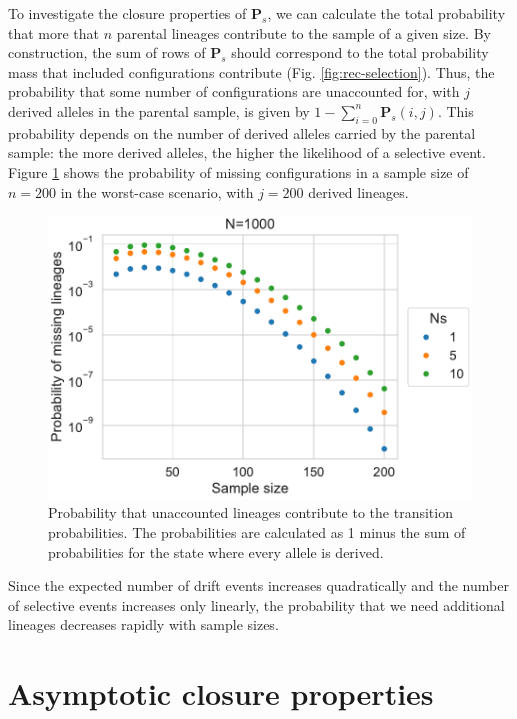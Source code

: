 \documentclass[review]{elsarticle}
\begin{document}
To investigate the closure properties of $\mathbf{P}_s$, we can calculate the total probability that
more that $n$ parental lineages contribute to the sample of a given size. By construction, the sum
of rows of $\mathbf{P}_s$ should correspond to the total probability mass that included
configurations contribute (Fig. \ref{fig:rec-selection}). Thus, the probability that some number of
configurations are unaccounted for, with $j$ derived alleles in the parental sample, is given by
$1-\sum_{i=0}^{n}\mathbf{P}_s(i,j)$. This probability depends on the number of derived alleles
carried by the parental sample: the more derived alleles, the higher the likelihood of a selective
event. Figure \ref{fig:missing} shows the probability of missing configurations in a sample size of
$n=200$ in the worst-case scenario, with $j=200$ derived lineages.

\begin{figure}
  \centering
  \includegraphics[]{fig/missing.pdf}
  \caption{Probability that unaccounted lineages contribute to the transition probabilities. The
    probabilities are calculated as 1 minus the sum of probabilities for the state where every
    allele is derived.}
  \label{fig:missing}
\end{figure}

Since the expected number of drift events increases quadratically and the number of selective events
increases only linearly, the probability that we need additional lineages decreases rapidly with
sample sizes.

\section{Asymptotic closure properties}
\end{document}
